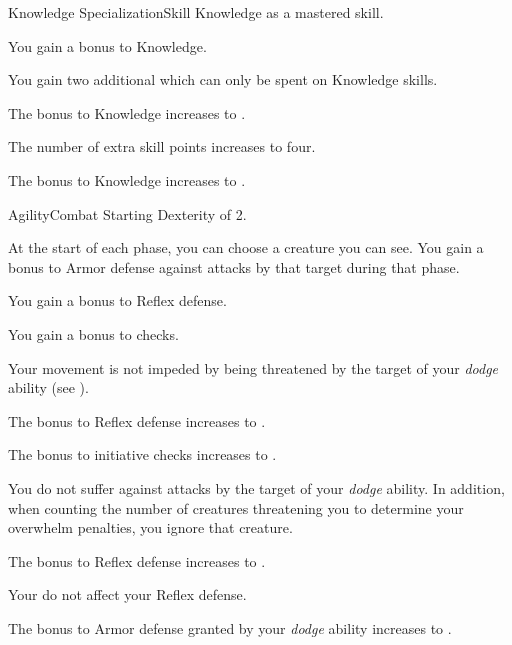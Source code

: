     \begin{feat}{Knowledge Specialization}{Skill}
        \featpre Knowledge as a mastered skill.
        \featben

         You gain a  bonus to Knowledge.

         You gain two additional  which can only be spent on Knowledge skills.

         The bonus to Knowledge increases to .

         The number of extra skill points increases to four.

         The bonus to Knowledge increases to .
    \end{feat}

    \begin{feat}{Agility}{Combat}
        \featpre Starting Dexterity of 2.
        \featben

         At the start of each phase, you can choose a creature you can see.
        You gain a  bonus to Armor defense against attacks by that target during that phase.

         You gain a  bonus to Reflex defense.

         You gain a  bonus to  checks.

         Your movement is not impeded by being threatened by the target of your \textit{dodge} ability (see ).

         The bonus to Reflex defense increases to .

         The bonus to initiative checks increases to .

         You do not suffer  against attacks by the target of your \textit{dodge} ability.
        In addition, when counting the number of creatures threatening you to determine your overwhelm penalties, you ignore that creature.

         The bonus to Reflex defense increases to .

         Your  do not affect your Reflex defense.

         The bonus to Armor defense granted by your \textit{dodge} ability increases to .
    \end{feat}

